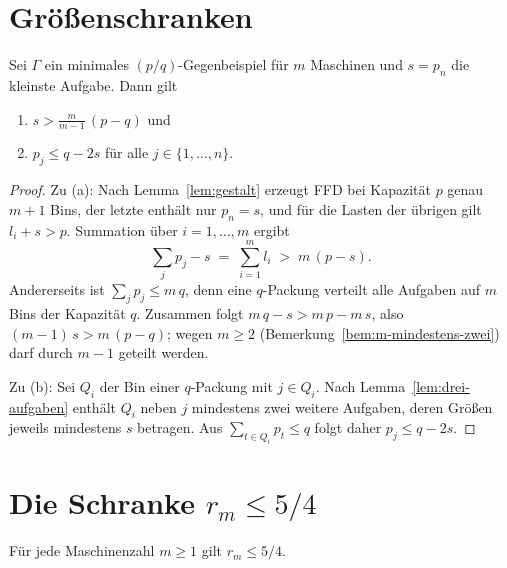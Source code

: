 \section{Größenschranken}
\label{sec:groessenschranken}

\begin{lemma}
\label{lem:groessenschranken}
Sei $\Gamma$ ein minimales $(p/q)$-Gegen\-bei\-spiel für $m$ Maschinen und $s = p_n$ die kleinste
Aufgabe. Dann gilt
\begin{enumerate}[label=(\alph*), nosep]
  \item $s > \frac{m}{m-1}\,(p-q)$ und
  \item $p_j \le q - 2s$ für alle $j \in \{1, \ldots, n\}$.
\end{enumerate}
\end{lemma}

\begin{proof}
Zu (a): Nach Lemma~\ref{lem:gestalt} erzeugt FFD bei Kapazität $p$ genau $m+1$ Bins, der letzte
enthält nur $p_n = s$, und für die Lasten der übrigen gilt $l_i + s > p$.
Summation über $i = 1, \ldots, m$ ergibt
\[
  \sum_{j} p_j - s \;=\; \sum_{i=1}^{m} l_i \;>\; m\,(p - s).
\]
Andererseits ist $\sum_j p_j \le m\,q$, denn eine $q$-Packung verteilt alle Aufgaben auf $m$ Bins
der Kapazität $q$.
Zusammen folgt $m\,q - s > m\,p - m\,s$, also $(m-1)\,s > m\,(p-q)$; wegen $m \ge 2$
(Bemerkung~\ref{bem:m-mindestens-zwei}) darf durch $m-1$ geteilt werden.

Zu (b): Sei $Q_i$ der Bin einer $q$-Packung mit $j \in Q_i$.
Nach Lemma~\ref{lem:drei-aufgaben} enthält $Q_i$ neben $j$ mindestens zwei weitere Aufgaben, deren
Größen jeweils mindestens $s$ betragen.
Aus $\sum_{t \in Q_i} p_t \le q$ folgt daher $p_j \le q - 2s$.
\end{proof}

\section{Die Schranke \texorpdfstring{$r_m \le 5/4$}{rm <= 5/4}}
\label{sec:schranke54}

\begin{theorem}
\label{thm:schranke54}
Für jede Maschinenzahl $m \ge 1$ gilt $r_m \le 5/4$.
\end{theorem}


